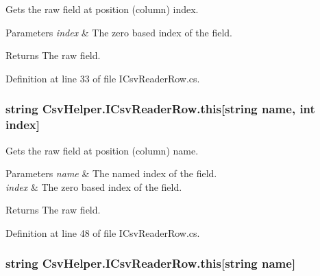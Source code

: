 Gets the raw field at position (column) index. 


\begin{DoxyParams}{Parameters}
{\em index} & The zero based index of the field.\\
\hline
\end{DoxyParams}
\begin{DoxyReturn}{Returns}
The raw field.
\end{DoxyReturn}


Definition at line 33 of file I\-Csv\-Reader\-Row.\-cs.

\hypertarget{a00115_abe611a2c471e6f11da579297bb876fb1}{
\subsubsection[{this[string name, int index]}]{\setlength{\rightskip}{0pt plus 5cm}string Csv\-Helper.\-I\-Csv\-Reader\-Row.\-this\mbox{[}string name, int index\mbox{]}\hspace{0.3cm}{\ttfamily [get]}}}\label{a00115_abe611a2c471e6f11da579297bb876fb1}


Gets the raw field at position (column) name. 


\begin{DoxyParams}{Parameters}
{\em name} & The named index of the field.\\
\hline
{\em index} & The zero based index of the field.\\
\hline
\end{DoxyParams}
\begin{DoxyReturn}{Returns}
The raw field.
\end{DoxyReturn}


Definition at line 48 of file I\-Csv\-Reader\-Row.\-cs.

\hypertarget{a00115_a999cf88bd8eb0b59c65b235cfe0e2835}{
\subsubsection[{this[string name]}]{\setlength{\rightskip}{0pt plus 5cm}string Csv\-Helper.\-I\-Csv\-Reader\-Row.\-this\mbox{[}string name\mbox{]}\hspace{0.3cm}{\ttfamily [get]}}}\label{a00115_a999cf88bd8eb0b59c65b235cfe0e2835}


